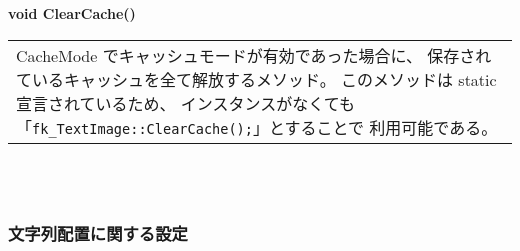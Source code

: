 \begin{tabbing}
\> \textbf{void ClearCache()} \\
	\> \> \begin{tabular}{p{15cm}}
		CacheMode でキャッシュモードが有効であった場合に、
		保存されているキャッシュを全て解放するメソッド。
		このメソッドは static 宣言されているため、
		インスタンスがなくても
		「\verb+fk_TextImage::ClearCache();+」とすることで
		利用可能である。
	\end{tabular} \\ \\

\end{tabbing}

\subsubsection{文字列配置に関する設定}
